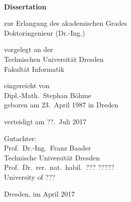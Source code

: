 \pagestyle{empty}

\begin{titlepage}
    \begin{center}
        \textbf{\textsf{\huge \thetitle}}\\
        \bigskip\bigskip\bigskip


        \Large
        \textbf{Dissertation}\\
        \bigskip\bigskip

        zur Erlangung des akademischen Grades\\
        Doktoringenieur (Dr.-Ing.)\\
        \bigskip\bigskip

        vorgelegt an der\\
        Technischen Universität Dresden\\
        Fakultät Informatik\\
        \bigskip\bigskip

        eingereicht von\\
        Dipl.-Math.\ Stephan Böhme\\
        geboren am 23.\ April 1987 in Dreden\\
        \bigskip\bigskip

        verteidigt am {??.\ Juli 2017}\\
        \vfill

        Gutachter:\\
        Prof.\ Dr.-Ing.\ Franz Baader\\
        Technische Universität Dresden\\[1ex]
        Prof.\ Dr.\ rer.\ nat.\ habil.\ ??? ?????\\
        University of ???

        \bigskip\bigskip

        Dresden, im April 2017
    \end{center}
\end{titlepage}

\cleardoubleemptypage

\pagestyle{scrheadings}


\tableofcontents
